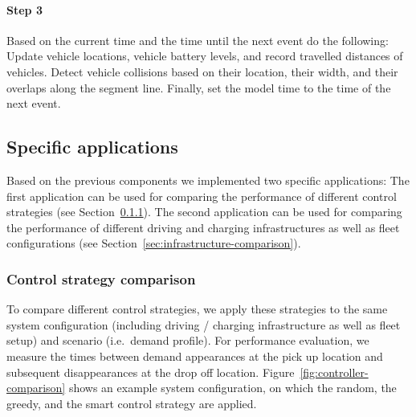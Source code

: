 \documentclass[a4paper,twoside]{article}
\begin{document}
	\paragraph{Step 3}
	
	Based on the current time and the time until the next event do the following:
	Update vehicle locations, vehicle battery levels, and record travelled distances of vehicles.
	Detect vehicle collisions based on their location, their width, and their overlaps along the segment line.
	Finally, set the model time to the time of the next event.
	
	\subsection{Specific applications}
	\label{sec:application}
	
	Based on the previous components we implemented two specific applications:
	The first application can be used for comparing the performance of different control strategies (see Section~\ref{sec:controller-comparison}).
	The second application can be used for comparing the performance of different driving and charging infrastructures as well as fleet configurations (see Section~\ref{sec:infrastructure-comparison}).
	
	\subsubsection{Control strategy comparison}
	\label{sec:controller-comparison}
	
	To compare different control strategies, we apply these strategies to the same system configuration (including driving / charging infrastructure as well as fleet setup) and scenario (i.e.\ demand profile).
	For performance evaluation, we measure the times between demand appearances at the pick up location and subsequent disappearances at the drop off location.
	Figure~\ref{fig:controller-comparison} shows an example system configuration, on which the random, the greedy, and the smart control strategy are applied.
	
\end{document}
